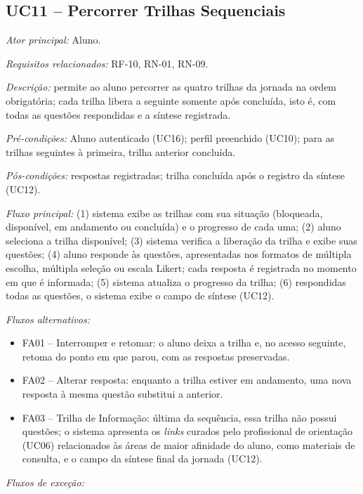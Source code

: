 \subsection*{UC11 -- Percorrer Trilhas Sequenciais}\label{uc:uc11}

\textit{Ator principal:} Aluno.

\textit{Requisitos relacionados:} RF-10, RN-01, RN-09.

\textit{Descrição:} permite ao aluno percorrer as quatro trilhas da jornada na ordem obrigatória; cada trilha libera a seguinte somente após concluída, isto é, com todas as questões respondidas e a síntese registrada.

\textit{Pré-condições:} Aluno autenticado (UC16); perfil preenchido (UC10); para as trilhas seguintes à primeira, trilha anterior concluída.

\textit{Pós-condições:} respostas registradas; trilha concluída após o registro da síntese (UC12).

\textit{Fluxo principal:} (1) sistema exibe as trilhas com sua situação (bloqueada, disponível, em andamento ou concluída) e o progresso de cada uma; (2) aluno seleciona a trilha disponível; (3) sistema verifica a liberação da trilha e exibe suas questões; (4) aluno responde às questões, apresentadas nos formatos de múltipla escolha, múltipla seleção ou escala Likert; cada resposta é registrada no momento em que é informada; (5) sistema atualiza o progresso da trilha; (6) respondidas todas as questões, o sistema exibe o campo de síntese (UC12).

\textit{Fluxos alternativos:}

\begin{itemize}[label={},leftmargin=\parindent,itemsep=0pt,topsep=0pt]
  \item FA01 – Interromper e retomar: o aluno deixa a trilha e, no acesso seguinte, retoma do ponto em que parou, com as respostas preservadas.
  \item FA02 – Alterar resposta: enquanto a trilha estiver em andamento, uma nova resposta à mesma questão substitui a anterior.
  \item FA03 – Trilha de Informação: última da sequência, essa trilha não possui questões; o sistema apresenta os \textit{links} curados pelo profissional de orientação (UC06) relacionados às áreas de maior afinidade do aluno, como materiais de consulta, e o campo da síntese final da jornada (UC12).
\end{itemize}

\textit{Fluxos de exceção:}

